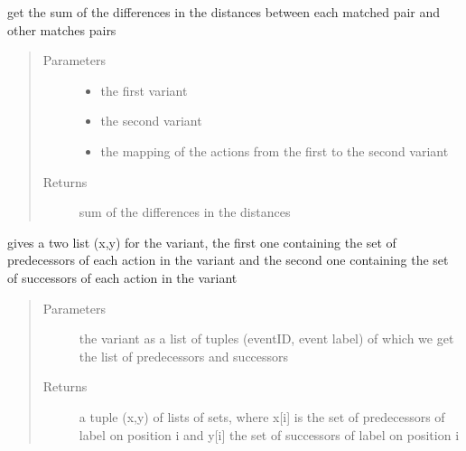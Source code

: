 \documentclass[letterpaper,10pt,english]{sphinxmanual}
\begin{document}
\begin{fulllineitems}
\label{\detokenize{cost function:costFunction.cost.costStructure}}
get the sum of the differences in the distances between each matched pair and other matches pairs
\begin{quote}\begin{description}
\item[{Parameters}] \leavevmode\begin{itemize}
\item {} 
 \textendash{} the first variant

\item {} 
 \textendash{} the second variant

\item {} 
 \textendash{} the mapping of the actions from the first to the second variant

\end{itemize}

\item[{Returns}] \leavevmode
sum of the differences in the distances

\end{description}\end{quote}

\end{fulllineitems}


\begin{fulllineitems}
\label{\detokenize{cost function:costFunction.cost.context}}
gives a two list (x,y) for the variant, the first one containing the set of predecessors of each action in the variant and the second one containing the set of successors of each action in the variant
\begin{quote}\begin{description}
\item[{Parameters}] \leavevmode
{} \textendash{} the variant as a list of tuples (eventID, event label) of which we get the list of predecessors and successors

\item[{Returns}] \leavevmode
a tuple (x,y) of lists of sets, where x{[}i{]} is the set of predecessors of label on position i and y{[}i{]} the set of successors of label on position i

\end{description}\end{quote}

\end{fulllineitems}
\end{document}
